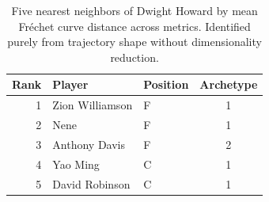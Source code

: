 \begin{table}[htbp]
  \centering\small
  \begin{tabular}{rllc}
    \toprule
    Rank & Player & Position & Archetype \\
    \midrule
    1 & Zion Williamson & F & 1 \\
    2 & Nene & F & 1 \\
    3 & Anthony Davis & F & 2 \\
    4 & Yao Ming & C & 1 \\
    5 & David Robinson & C & 1 \\
    \bottomrule
  \end{tabular}
  \caption{Five nearest neighbors of Dwight Howard by mean Fr\'{e}chet curve distance across metrics. Identified purely from trajectory shape without dimensionality reduction.}
  \label{tab:Dwight_Howard_frechet_curve_neighbors}
\end{table}

